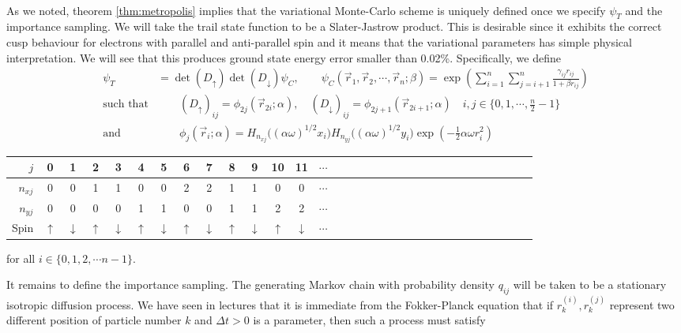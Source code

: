 \documentclass[11pt,english,a4paper]{article}
\begin{document}
\\
As we noted, theorem \ref{thm:metropolis} implies that the variational Monte-Carlo scheme is uniquely defined once we specify $\psi_T$ and the importance sampling. We will take the trail state function to be a Slater-Jastrow product. This is desirable since it exhibits the correct cusp behaviour for electrons with parallel and anti-parallel spin and it means that the variational parameters has simple physical interpretation. We will see that this produces ground state energy error smaller than 0.02\%. Specifically, we define
\begin{align}
\psi_T &= \det(D_\uparrow)\det(D_\downarrow)\psi_C, \qquad \psi_C(\vec{r}_1, \vec{r}_2, \cdots, \vec{r}_n; \beta) = \exp\left( \sum_{i=1}^n\sum_{j=i+1}^n \frac{\gamma_{ij} r_{ij}}{1 + \beta  r_{ij}} \right) \label{eq:wf} \\
\text{such that}& \qquad  (D_\uparrow)_{  ij} = \phi_{2j}(\vec{r}_{2i}; \alpha), \quad (D_\downarrow)_{  ij} = \phi_{2j+1}(\vec{r}_{2i + 1};\alpha) \quad i,j \in \{0,1,\cdots,\frac{n}{2}-1\} \nonumber \\
\text{and}& \qquad \phi_{j}(\vec{r}_i;\alpha) = H_{n_{xj}}\big( (\alpha \omega)^{1/2} x_i\big) H_{n_{yj}}\big( (\alpha \omega)^{1/2} y_i\big) \exp \left( - \frac{1}{2}\alpha \omega r_i^2 \right)
\end{align}
\begin{center}
\begin{tabular}{r |c c c c c c c c c c c c c c c c c c c c c c c c c c c c c c c}
$j$ & 0 & 1 & 2 & 3 & 4 & 5 & 6 & 7 & 8 & 9 & 10 & 11 & $\cdots$ \\
\hline
$n_{xj}$& 0 & 0 & 1 & 1 & 0 & 0 & 2 & 2 & 1 & 1 & 0 & 0 & $\cdots$  \\
$n_{yj}$& 0 & 0 & 0 & 0 & 1 & 1 & 0 & 0 & 1 & 1 & 2 & 2 & $\cdots$ \\
Spin & $\uparrow$ & $\downarrow$& $\uparrow$ & $\downarrow$& $\uparrow$ & $\downarrow$& $\uparrow$ & $\downarrow$& $\uparrow$ & $\downarrow$& $\uparrow$ & $\downarrow$& $\cdots$ 
\end{tabular} \qquad for all $i \in \{0,1,2,\cdots n-1\}$.
\end{center}
It remains to define the importance sampling. The generating Markov chain with probability density $q_{ij}$ will be taken to be a stationary isotropic diffusion process. We have seen in lectures that it is immediate from the Fokker-Planck equation that if $r^{(i)}_k,r^{(j)}_k$ represent two different position of particle number $k$ and $\Delta t > 0$ is a parameter, then such a process must satisfy
\end{document}
